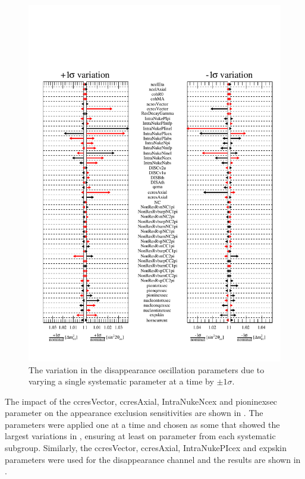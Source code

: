 \begin{figure}[h!]
    \centering
    \includegraphics[width = \largefigwidth]{figures-chap6/star_plot/nue_dsisapp_pulls.pdf}
    \caption[\nue disappearance oscillation parameter pulls due to varying a single systematic parameter by $\pm1\sigma$.]{The variation in the \nue disappearance oscillation parameters due to varying a single systematic parameter at a time by $\pm1\sigma$.}
    \label{fig:nue_disapp_osc_param_pulls}
\end{figure}

The impact of the ccresVector, ccresAxial, IntraNukeNcex and pioninexsec parameter on the \nue appearance exclusion sensitivities are shown in . The parameters were applied one at a time and chosen as some that showed the largest variations in , ensuring at least on parameter from each systematic subgroup. Similarly, the ccresVector, ccresAxial, IntraNukePIcex and expskin parameters were used for the \nue disappearance channel and the results are shown in .

